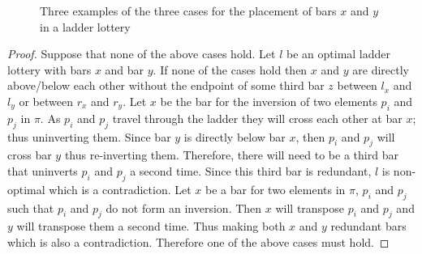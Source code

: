 \begin{figure}[h]
\begin{minipage}{.3\textwidth}
            \end{minipage}
        

    \caption{Three examples of the three cases for the placement 
    of bars $x$ and $y$ in a ladder lottery}
    \label{fig:three-cases}
\end{figure}

\begin{proof}
    Suppose that none of the above cases hold. Let $l$ be an 
    optimal ladder lottery with bars $x$ and 
    bar $y$. If none of the cases hold then $x$ and $y$ are directly above/below each other without 
    the endpoint of some third bar $z$ between $l_{x}$ and $l_{y}$ or between $r_{x}$ and $r_{y}$.
    Let $x$ be the bar for the inversion of two elements $p_{i}$ and $p_{j}$ in $\pi$. 
    As $p_{i}$ and $p_{j}$ travel through the ladder they will cross each other at bar $x$; 
    thus uninverting them. Since bar $y$ is directly below bar $x$, then $p_{i}$ and $p_{j}$ will cross 
    bar $y$ thus re-inverting them. Therefore, there will need to be a third 
    bar that uninverts $p_{i}$ and $p_{j}$ a second time. Since this third bar is 
    redundant, $l$ is non-optimal which is a contradiction. Let $x$ be a bar for two 
    elements in $\pi$, $p_{i}$ and $p_{j}$ such that $p_{i}$ and $p_{j}$ do not form an inversion. Then $x$ 
    will transpose $p_{i}$ and $p_{j}$ and $y$ will transpose them a second time. Thus making both $x$ and $y$ redundant
    bars which is also a contradiction. Therefore one of the above cases must hold.
\end{proof}



